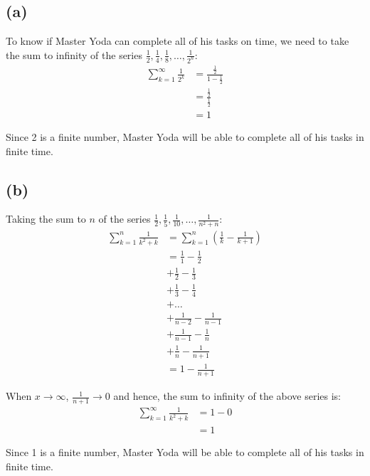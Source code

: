 \documentclass[11pt]{article}
\begin{document}
\subsection{(a)}
\label{sec:orgafb408d}

To know if Master Yoda can complete all of his tasks on time, we need to take the sum to infinity of the series \(\frac{1}{2}, \frac{1}{4}, \frac{1}{8}, \ldots, \frac{1}{2^n}\):
\begin{align*}
\sum_{k=1}^{\infty} \frac{1}{2^k} &= \frac{\frac{1}{2}}{1 - \frac{1}{2}} \\
&= \frac{\frac{1}{2}}{\frac{1}{2}} \\
&= 1
\end{align*}

Since 2 is a finite number, Master Yoda will be able to complete all of his tasks in finite time.

\newpage

\subsection{(b)}
\label{sec:orga8e23cd}

Taking the sum to \(n\) of the series \(\frac{1}{2}, \frac{1}{5}, \frac{1}{10}, \ldots, \frac{1}{n^2 + n}\):
\begin{align*}
\sum_{k=1}^{n} \frac{1}{k^2 + k} &= \sum_{k=1}^{n} \left(\frac{1}{k} - \frac{1}{k + 1} \right) \\
&= \frac{1}{1} - \frac{1}{2} \\
&+ \frac{1}{2} - \frac{1}{3} \\
&+ \frac{1}{3} - \frac{1}{4} \\
&+ \ldots \\
&+ \frac{1}{n - 2} - \frac{1}{n - 1} \\
&+ \frac{1}{n - 1} - \frac{1}{n} \\
&+ \frac{1}{n} - \frac{1}{n + 1} \\
&= 1 - \frac{1}{n + 1}
\end{align*}

When \(x \rightarrow \infty\), \(\frac{1}{n + 1} \rightarrow 0\) and hence, the sum to infinity of the above series is:
\begin{align*}
\sum_{k=1}^{\infty} \frac{1}{k^2 + k} &= 1 - 0 \\
&= 1
\end{align*}

Since 1 is a finite number, Master Yoda will be able to complete all of his tasks in finite time.
\end{document}
